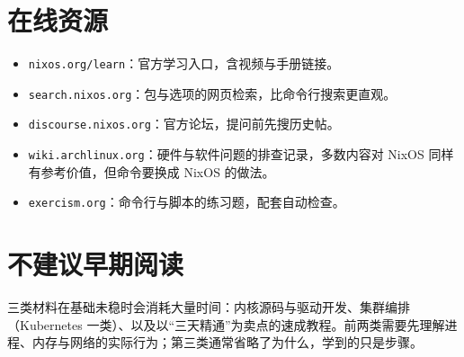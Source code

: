 \section{在线资源}

\begin{itemize}
  \item \texttt{nixos.org/\allowbreak{}learn}：官方学习入口，含视频与手册链接。
  \item \texttt{search.nixos.\allowbreak{}org}：包与选项的网页检索，比命令行搜索更直观。
  \item \texttt{discourse.nixos.\allowbreak{}org}：官方论坛，提问前先搜历史帖。
  \item \texttt{wiki.archlinux.org}：硬件与软件问题的排查记录，多数内容对 NixOS 同样有参考价值，但命令要换成 NixOS 的做法。
  \item \texttt{exercism.org}：命令行与脚本的练习题，配套自动检查。
\end{itemize}

\section{不建议早期阅读}

三类材料在基础未稳时会消耗大量时间：内核源码与驱动开发、集群编排（Kubernetes 一类）、以及以“三天精通”为卖点的速成教程。前两类需要先理解进程、内存与网络的实际行为；第三类通常省略了为什么，学到的只是步骤。
